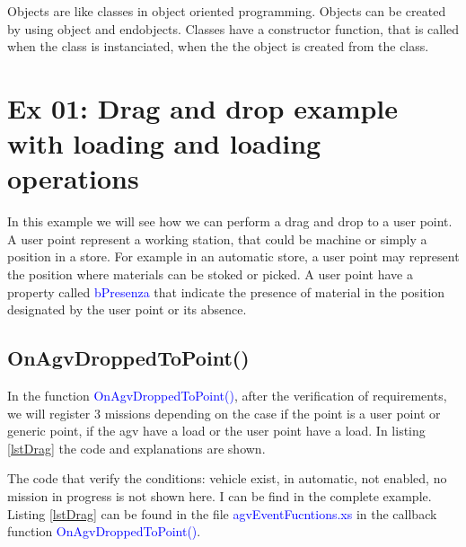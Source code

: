 Objects are like classes in object oriented programming. Objects can be created by using object and endobjects.
Classes have a constructor function, that is called when the class is instanciated, when the the object is created from the class.

%
\section{Ex 01: Drag and drop example with loading and loading operations}

In this example we will see how we can perform a drag and drop to a user point. A user point represent a working station, that could be machine or simply a position in a store. For example in an automatic store, a user point may represent the position where materials can be stoked or picked. A user point have a property called \textcolor{blue}{bPresenza} that indicate the presence of material in the position designated by the user point or its absence.\\

%
\subsection*{OnAgvDroppedToPoint()}
In the function \textcolor{blue}{OnAgvDroppedToPoint()}, after the verification of requirements, we will register 3 missions depending on the case if the point is a user point or generic point, if the agv have a load or the user point have a load. In listing \ref{lstDrag} the code and explanations are shown.

The code that verify the conditions: vehicle exist, in automatic, not enabled, no mission in progress is not shown here. I can be find in the complete example.\\

Listing \ref{lstDrag} can be found in the file \textcolor{blue}{agvEventFucntions.xs} in the callback function \textcolor{blue}{OnAgvDroppedToPoint()}.

